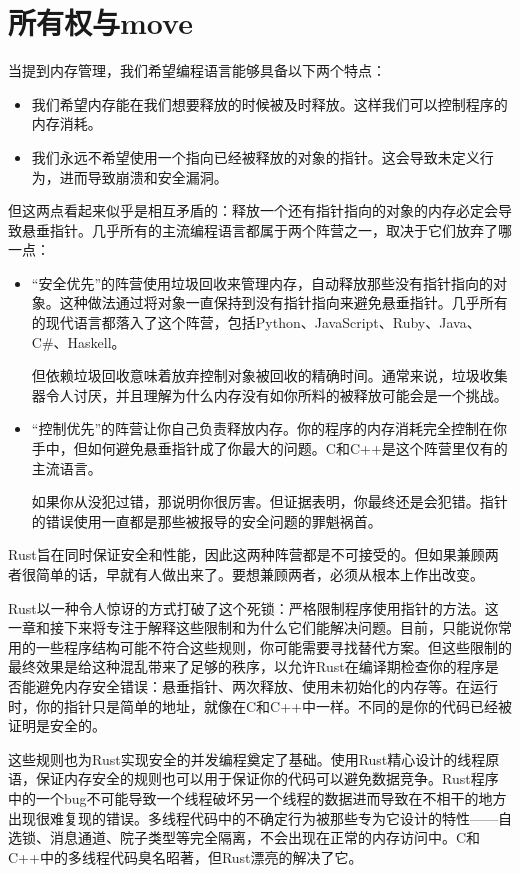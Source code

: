 \chapter{所有权与move}\label{ch04}

当提到内存管理，我们希望编程语言能够具备以下两个特点：
\begin{itemize}
    \item 我们希望内存能在我们想要释放的时候被及时释放。这样我们可以控制程序的内存消耗。
    \item 我们永远不希望使用一个指向已经被释放的对象的指针。这会导致未定义行为，进而导致崩溃和安全漏洞。
\end{itemize}

但这两点看起来似乎是相互矛盾的：释放一个还有指针指向的对象的内存必定会导致悬垂指针。几乎所有的主流编程语言都属于两个阵营之一，取决于它们放弃了哪一点：
\begin{itemize}
    \item “安全优先”的阵营使用垃圾回收来管理内存，自动释放那些没有指针指向的对象。这种做法通过将对象一直保持到没有指针指向来避免悬垂指针。几乎所有的现代语言都落入了这个阵营，包括Python、JavaScript、Ruby、Java、C\#、Haskell。

    但依赖垃圾回收意味着放弃控制对象被回收的精确时间。通常来说，垃圾收集器令人讨厌，并且理解为什么内存没有如你所料的被释放可能会是一个挑战。

    \item “控制优先”的阵营让你自己负责释放内存。你的程序的内存消耗完全控制在你手中，但如何避免悬垂指针成了你最大的问题。C和C++是这个阵营里仅有的主流语言。

    如果你从没犯过错，那说明你很厉害。但证据表明，你最终还是会犯错。指针的错误使用一直都是那些被报导的安全问题的罪魁祸首。
\end{itemize}

Rust旨在同时保证安全和性能，因此这两种阵营都是不可接受的。但如果兼顾两者很简单的话，早就有人做出来了。要想兼顾两者，必须从根本上作出改变。

Rust以一种令人惊讶的方式打破了这个死锁：严格限制程序使用指针的方法。这一章和接下来将专注于解释这些限制和为什么它们能解决问题。目前，只能说你常用的一些程序结构可能不符合这些规则，你可能需要寻找替代方案。但这些限制的最终效果是给这种混乱带来了足够的秩序，以允许Rust在编译期检查你的程序是否能避免内存安全错误：悬垂指针、两次释放、使用未初始化的内存等。在运行时，你的指针只是简单的地址，就像在C和C++中一样。不同的是你的代码已经被证明是安全的。

这些规则也为Rust实现安全的并发编程奠定了基础。使用Rust精心设计的线程原语，保证内存安全的规则也可以用于保证你的代码可以避免数据竞争。Rust程序中的一个bug不可能导致一个线程破坏另一个线程的数据进而导致在不相干的地方出现很难复现的错误。多线程代码中的不确定行为被那些专为它设计的特性——自选锁、消息通道、院子类型等完全隔离，不会出现在正常的内存访问中。C和C++中的多线程代码臭名昭著，但Rust漂亮的解决了它。

